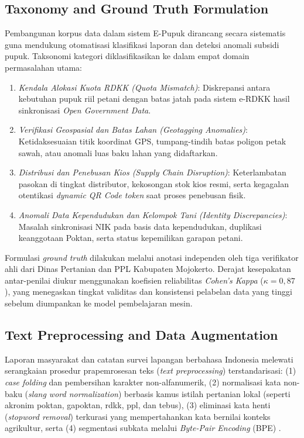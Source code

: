 ﻿\documentclass[conference]{IEEEtran}
\begin{document}
\subsection{Taxonomy and Ground Truth Formulation}
Pembangunan korpus data dalam sistem E-Pupuk dirancang secara sistematis guna mendukung otomatisasi klasifikasi laporan dan deteksi anomali subsidi pupuk. Taksonomi kategori diklasifikasikan ke dalam empat domain permasalahan utama:
\begin{enumerate}
    \item \textit{Kendala Alokasi Kuota RDKK (Quota Mismatch)}: Diskrepansi antara kebutuhan pupuk riil petani dengan batas jatah pada sistem e-RDKK hasil sinkronisasi \textit{Open Government Data}.
    \item \textit{Verifikasi Geospasial dan Batas Lahan (Geotagging Anomalies)}: Ketidaksesuaian titik koordinat GPS, tumpang-tindih batas poligon petak sawah, atau anomali luas baku lahan yang didaftarkan.
    \item \textit{Distribusi dan Penebusan Kios (Supply Chain Disruption)}: Keterlambatan pasokan di tingkat distributor, kekosongan stok kios resmi, serta kegagalan otentikasi \textit{dynamic QR Code token} saat proses penebusan fisik.
    \item \textit{Anomali Data Kependudukan dan Kelompok Tani (Identity Discrepancies)}: Masalah sinkronisasi NIK pada basis data kependudukan, duplikasi keanggotaan Poktan, serta status kepemilikan garapan petani.
\end{enumerate}
Formulasi \textit{ground truth} dilakukan melalui anotasi independen oleh tiga verifikator ahli dari Dinas Pertanian dan PPL Kabupaten Mojokerto. Derajat kesepakatan antar-penilai diukur menggunakan koefisien reliabilitas \textit{Cohen's Kappa} ($\kappa = 0{,}87$), yang menegaskan tingkat validitas dan konsistensi pelabelan data yang tinggi sebelum diumpankan ke model pembelajaran mesin.

\subsection{Text Preprocessing and Data Augmentation}
Laporan masyarakat dan catatan survei lapangan berbahasa Indonesia melewati serangkaian prosedur prapemrosesan teks (\textit{text preprocessing}) terstandarisasi: (1) \textit{case folding} dan pembersihan karakter non-alfanumerik, (2) normalisasi kata non-baku (\textit{slang word normalization}) berbasis kamus istilah pertanian lokal (seperti akronim poktan, gapoktan, rdkk, ppl, dan tebus), (3) eliminasi kata henti (\textit{stopword removal}) terkurasi yang mempertahankan kata bernilai konteks agrikultur, serta (4) segmentasi subkata melalui \textit{Byte-Pair Encoding} (BPE) \cite{b4}.
\end{document}
